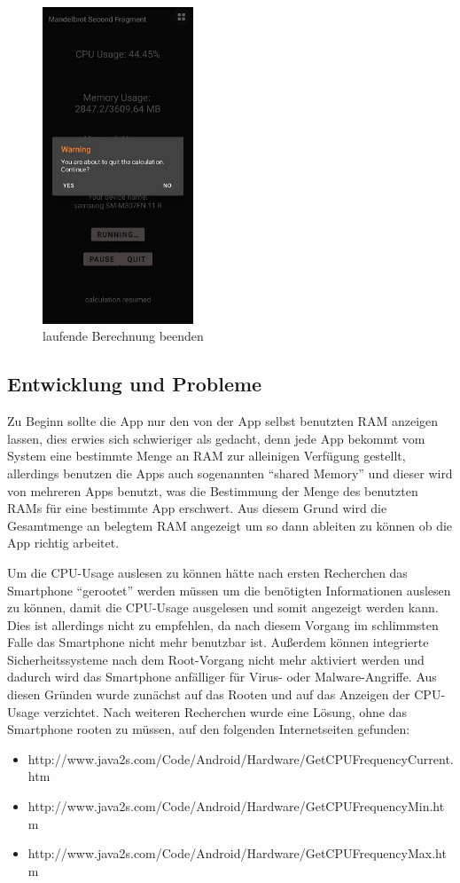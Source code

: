 \documentclass[12pt, onecolumn, notitlepage]{scrartcl}
\begin{document}
\begin{figure}[H] 
	\centering
	\includegraphics[height=0.5\textheight,width=0.4\textwidth]{calc_quit.jpg}
	\caption{laufende Berechnung beenden}
\end{figure}


\subsection{Entwicklung und Probleme}
Zu Beginn sollte die App nur den von der App selbst benutzten RAM anzeigen lassen, dies erwies sich schwieriger als gedacht, denn jede App bekommt vom System eine bestimmte Menge an RAM zur alleinigen Verfügung gestellt, allerdings benutzen die Apps auch sogenannten \enquote{shared Memory} und dieser wird von mehreren Apps benutzt, was die Bestimmung der Menge des benutzten RAMs für eine bestimmte App erschwert. Aus diesem Grund wird die Gesamtmenge an belegtem RAM angezeigt um so dann ableiten zu können ob die App richtig arbeitet. \par
Um die CPU-Usage auslesen zu können hätte nach ersten Recherchen das Smartphone \enquote{gerootet} werden müssen um die benötigten Informationen auslesen zu können, damit die CPU-Usage ausgelesen und somit angezeigt werden kann. Dies ist allerdings nicht zu empfehlen, da nach diesem Vorgang im schlimmsten Falle das Smartphone nicht mehr benutzbar ist. Außerdem können integrierte Sicherheitssysteme nach dem Root-Vorgang nicht mehr aktiviert werden und dadurch wird das Smartphone anfälliger für Virus- oder Malware-Angriffe. Aus diesen Gründen wurde zunächst auf das Rooten und auf das Anzeigen der CPU-Usage verzichtet. Nach weiteren Recherchen wurde eine Lösung, ohne das Smartphone rooten zu müssen, auf den folgenden Internetseiten gefunden:
\begin{itemize}
	\itemsep0pt
	\item http://www.java2s.com/Code/Android/Hardware/GetCPUFrequencyCurrent.htm
	\item http://www.java2s.com/Code/Android/Hardware/GetCPUFrequencyMin.htm
	\item http://www.java2s.com/Code/Android/Hardware/GetCPUFrequencyMax.htm 
\end{itemize}
\end{document}

